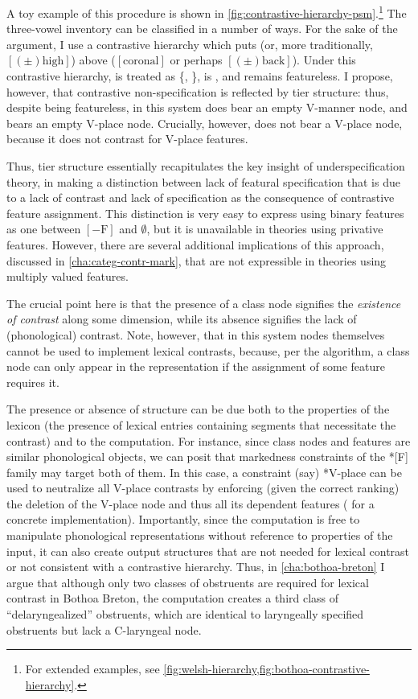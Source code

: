 A toy example of this procedure is shown in \cref{fig:contrastive-hierarchy-psm}.\footnote{For extended examples, see \cref{fig:welsh-hierarchy,fig:bothoa-contrastive-hierarchy}.} The three\hyp vowel inventory  can be classified in a number of ways. For the sake of the argument, I use a contrastive hierarchy which puts  (or, more traditionally, $[(\pm)\mbox{high}]$) above  ($[\mbox{coronal}]$ or perhaps $[(\pm)\mbox{back}]$). Under this contrastive hierarchy,  is treated as \{, \},  is , and  remains featureless. I propose, however, that contrastive non\hyp specification is reflected by tier structure: thus, despite being featureless,  in this system does bear an empty V-manner node, and  bears an empty V-place node. Crucially, however,  does not bear a V-place node, because it does not contrast for V-place features.

Thus, tier structure essentially recapitulates the key insight of underspecification theory, in making a distinction between lack of featural specification that is due to a lack of contrast and lack of specification as the consequence of contrastive feature assignment. This distinction is very easy to express using binary features as one between $[-\mbox{F}]$ and $\emptyset$, but it is unavailable in theories using privative features. However, there are several additional implications of this approach, discussed in \cref{cha:categ-contr-mark}, that are not expressible in theories using multiply valued features.

The crucial point here is that the presence of a class node signifies the \emph{existence of contrast} along some dimension, while its absence signifies the lack of (phonological) contrast. Note, however, that in this system nodes themselves cannot be used to implement lexical contrasts, because, per the algorithm, a class node can only appear in the representation if the assignment of some feature requires it.

The presence or absence of structure can be due both to the properties of the lexicon (\ie the presence of lexical entries containing segments that necessitate the contrast) and to the computation. For instance, since class nodes and features are similar phonological objects, we can posit that markedness constraints of the *[F] family may target both of them. In this case, a constraint (say) *V-place can be used to neutralize all V-place contrasts by enforcing (given the correct ranking) the deletion of the V-place node and thus all its dependent features (\citealp[\cf][]{ghini01:_place} for a concrete implementation). Importantly, since the computation is free to manipulate phonological representations without reference to properties of the input, it can also create output structures that are not needed for lexical contrast or not consistent with a contrastive hierarchy. Thus, in \cref{cha:bothoa-breton} I argue that although only two classes of obstruents are required for lexical contrast in Bothoa Breton, the computation creates a third class of \enquote{delaryngealized} obstruents, which are identical to laryngeally specified obstruents but lack a C-laryngeal node.

